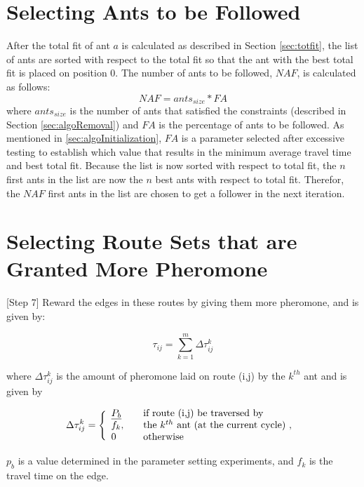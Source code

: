 \section{Selecting Ants to be Followed}
\label{sec:selctingAntsToBeFollowed}
After the total fit of ant $a$ is calculated as described in Section \vref{sec:totfit}, the list of ants are sorted with respect to the total fit so that the ant with the best total fit is placed on position 0. The number of ants to be followed, $NAF$, is calculated as follows:
\newline
$$NAF = ants_{size} * FA$$
\newline 
where $ants_{size}$ is the number of ants that satisfied the constraints (described in Section \vref{sec:algoRemoval}) and $FA$ is the percentage of ants to be followed. As mentioned in \vref{sec:algoInitialization}, $FA$ is a parameter selected after excessive testing to establish which value that results in the minimum average travel time and best total fit. Because the list is now sorted with respect to total fit, the $n$ first ants in the list are now the $n$ best ants with respect to total fit. Therefor, the $NAF$ first ants in the list are chosen to get a follower in the next iteration.

\section{Selecting Route Sets that are Granted More Pheromone}



[Step 7] Reward the edges in these routes by giving them more pheromone, and is given by:

$$ \tau_{ij} = \sum_{k=1}^{m} \Delta \tau^k_{ij}$$

where $ \Delta \tau^k_{ij} $ is the amount of pheromone laid on route (i,j) by the $k^{th}$ ant and is given by

$$
\Delta \tau^k_{ij} = \Bigg\{
\begin{array}{l l}
\underline{P_{b}} &  \quad \text{if route (i,j) be traversed by}\\
f_k, &  \quad \text{the $k^{th}$ ant (at the current cycle) , }\\
0 &  \quad \text{otherwise}
\end{array}
$$

$p_b$ is a value determined in the parameter setting experiments, and $f_k$ is the travel time on the edge.